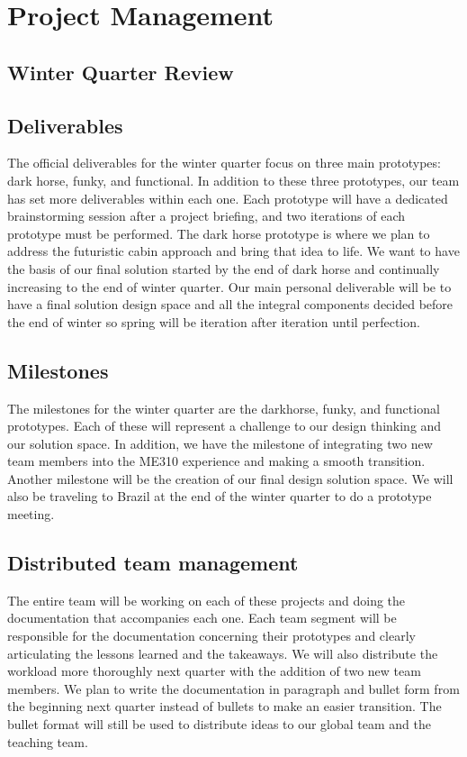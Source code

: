 \chapter{Project Management}
\label{project-planning}

\section{Winter Quarter Review}

\section{Deliverables}
The official deliverables for the winter quarter focus on three main prototypes: dark horse, funky, and functional.  In addition to these three prototypes, our team has set more deliverables within each one.  Each prototype will have a dedicated brainstorming session after a project briefing, and two iterations of each prototype must be performed. The dark horse prototype is where we plan to address the futuristic cabin approach and bring that idea to life.  We want to have the basis of our final solution started by the end of dark horse and continually increasing to the end of winter quarter.  Our main personal deliverable will be to have a final solution design space and all the integral components decided before the end of winter so spring will be iteration after iteration until perfection. 

\section{Milestones}
The milestones for the winter quarter are the darkhorse, funky, and functional prototypes.  Each of these will represent a challenge to our design thinking and our solution space.  In addition, we have the milestone of integrating two new team members into the ME310 experience and making a smooth transition.  Another milestone will be the creation of our final design solution space.  We will also be traveling to Brazil at the end of the winter quarter to do a prototype meeting. 

\section{Distributed team management}
The entire team will be working on each of these projects and doing the documentation that accompanies each one.  Each team segment will be responsible for the documentation concerning their prototypes and clearly articulating the lessons learned and the takeaways. We will also distribute the workload more thoroughly next quarter with the addition of two new team members.  We plan to write the documentation in paragraph and bullet form from the beginning next quarter instead of bullets to make an easier transition.  The bullet format will still be used to distribute ideas to our global team and the teaching team.  

